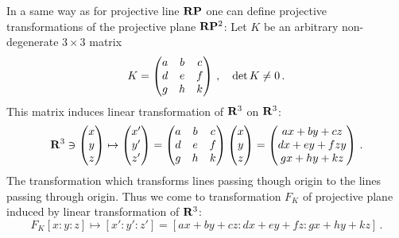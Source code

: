 \documentclass[12pt]{article}
\numberwithin{equation}{section}
\begin{document}
In a same way as for projective line ${\bf R}{\bf P}$
one can define projective transformations of the projective plane
${\bf R}{\bf P}^2$:
  Let $K$ be an arbitrary non-degenerate $3\times 3$
matrix
        $$
K=\begin{pmatrix} 
  a &b & c\cr
  d &e & f\cr
  g &h & k\cr
      \end{pmatrix}
\,,\quad \det K\not=0\,.
        $$ 
This matrix induces linear transformation of ${\bf R}^3$ on ${\bf R}^3$:
             \begin{equation}
  {\bf R}^3\ni 
             \begin{pmatrix}
               x\cr y\cr z\cr
                \end{pmatrix}
         \mapsto
             \begin{pmatrix}
               x'\cr y'\cr z'\cr
                \end{pmatrix}
                =\begin{pmatrix} 
  a &b & c\cr
  d &e & f\cr
  g &h & k\cr
      \end{pmatrix}
             \begin{pmatrix}
               x\cr y\cr z\cr
                \end{pmatrix}
           =
             \begin{pmatrix}
               ax+by+cz\cr 
         dx+ey+fzy\cr 
        gx+hy+kz\cr
                \end{pmatrix}\,.
            \end{equation}
 The transformation which transforms lines passing though
 origin to the lines passing through origin.   
Thus we come to transformation
$F_K$ of projective plane induced by linear transformation of ${\bf R}^3$:
\begin{equation}
F_K [x:y:z]\mapsto
    [x':y':z']=
[ax+by+cz: dx+ey+fz:gx+hy+kz]\,. 
\end{equation}
\end{document}
